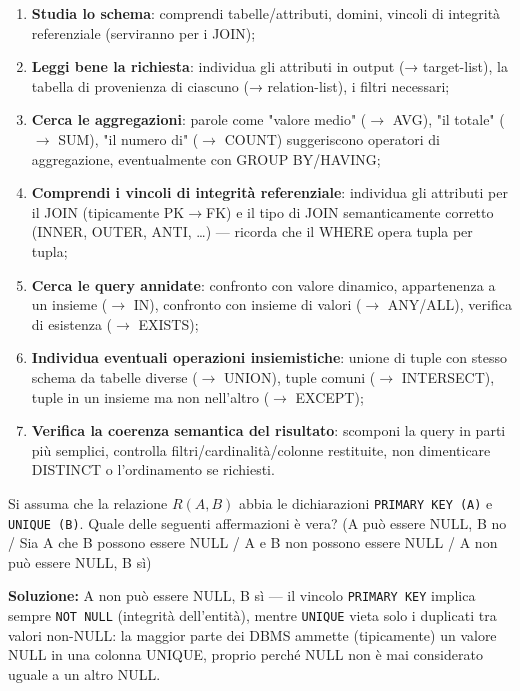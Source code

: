 \documentclass[12pt, a4paper]{article}
\begin{document}
\begin{enumerate}
    \item \textbf{Studia lo schema}: comprendi tabelle/attributi, domini, vincoli di integrità referenziale (serviranno per i JOIN);
    \item \textbf{Leggi bene la richiesta}: individua gli attributi in output (→ target-list), la tabella di provenienza di ciascuno (→ relation-list), i filtri necessari;
    \item \textbf{Cerca le aggregazioni}: parole come "valore medio" ($\to$ AVG), "il totale" ($\to$ SUM), "il numero di" ($\to$ COUNT) suggeriscono operatori di aggregazione, eventualmente con GROUP BY/HAVING;
    \item \textbf{Comprendi i vincoli di integrità referenziale}: individua gli attributi per il JOIN (tipicamente PK$\to$FK) e il tipo di JOIN semanticamente corretto (INNER, OUTER, ANTI, \ldots) — ricorda che il WHERE opera tupla per tupla;
    \item \textbf{Cerca le query annidate}: confronto con valore dinamico, appartenenza a un insieme ($\to$ IN), confronto con insieme di valori ($\to$ ANY/ALL), verifica di esistenza ($\to$ EXISTS);
    \item \textbf{Individua eventuali operazioni insiemistiche}: unione di tuple con stesso schema da tabelle diverse ($\to$ UNION), tuple comuni ($\to$ INTERSECT), tuple in un insieme ma non nell'altro ($\to$ EXCEPT);
    \item \textbf{Verifica la coerenza semantica del risultato}: scomponi la query in parti più semplici, controlla filtri/cardinalità/colonne restituite, non dimenticare DISTINCT o l'ordinamento se richiesti.
\end{enumerate}

\begin{tcolorbox}[colback=lightergray!10, colframe=tocsec, title=\textbf{Esercizio 2}]
Si assuma che la relazione $R(A,B)$ abbia le dichiarazioni \texttt{PRIMARY KEY (A)} e \texttt{UNIQUE (B)}. Quale delle seguenti affermazioni è vera? (A può essere NULL, B no / Sia A che B possono essere NULL / A e B non possono essere NULL / A non può essere NULL, B sì)
\end{tcolorbox}
\textbf{Soluzione:} A non può essere NULL, B sì — il vincolo \texttt{PRIMARY KEY} implica sempre \texttt{NOT NULL} (integrità dell'entità), mentre \texttt{UNIQUE} vieta solo i duplicati tra valori non-NULL: la maggior parte dei DBMS ammette (tipicamente) un valore NULL in una colonna UNIQUE, proprio perché NULL non è mai considerato uguale a un altro NULL.
\end{document}

